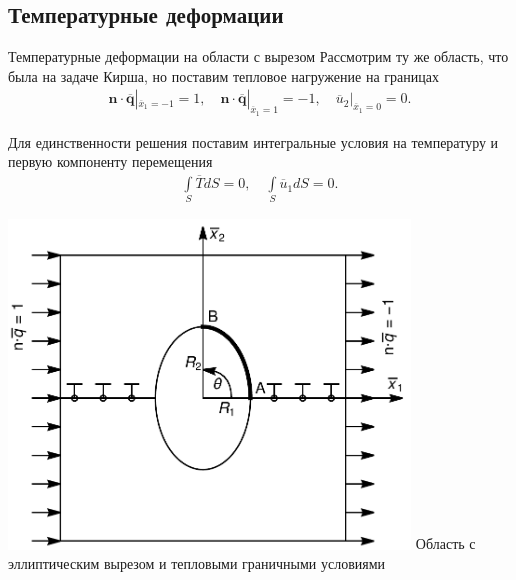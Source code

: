 \subsection{Температурные деформации}
\begin{frame}{Температурные деформации на области с вырезом}
	Рассмотрим ту же область, что была на задаче Кирша, но поставим тепловое нагружение на границах
\begin{gather*}
	\boldsymbol{n} \cdot \overline{\boldsymbol{q}}|_{\overline{x}_1 = -1} = 1,
	\quad
	\boldsymbol{n} \cdot \overline{\boldsymbol{q}}|_{\overline{x}_1 = 1} = -1,
	\quad
	\overline{u}_2 |_{\overline{x}_1 = 0} = 0.
\end{gather*}
\begin{minipage}{0.49\textwidth}
	Для единственности решения поставим интегральные условия на температуру и первую компоненту перемещения
	\begin{gather*}
		\int\limits_S \overline{T} dS = 0,
		\quad
		\int\limits_S \overline{u}_1 dS = 0.
	\end{gather*}
\end{minipage}
\begin{minipage}{0.49\textwidth}
	\centering
	\includegraphics[width=0.8\textwidth]{pics/EllipseThermalPresentation.pdf}
	Область с эллиптическим вырезом и тепловыми граничными условиями
\end{minipage}
\end{frame}


